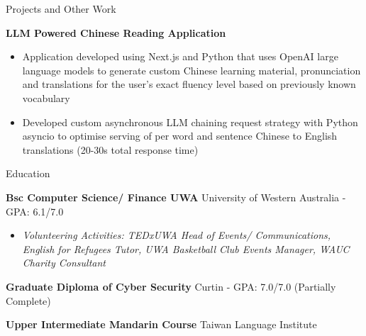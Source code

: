 \documentclass{resume} %
\begin{document}
	\begin{rSection}{Projects and Other Work}
		\vspace{-0.8em}
		\item \textbf{LLM Powered Chinese Reading Application} 
		\begin{itemize} 
			\item Application developed using Next.js and Python that uses OpenAI large language models to generate custom Chinese learning material, pronunciation and translations for the user's exact fluency level based on previously known vocabulary
			\item Developed custom asynchronous LLM chaining request strategy with Python asyncio to optimise serving of per word and sentence Chinese to English translations (20-30s total response time)
		\end{itemize}
	\end{rSection} 
	
	\begin{rSection}{Education}
		\vspace{-0.8em}
		\item \textbf{Bsc Computer Science/ Finance UWA} {University of Western Australia} - GPA: 6.1/7.0 \hfill 
		\begin{itemize} 
			\scriptsize\item \textit{Volunteering Activities: TEDxUWA Head of Events/ Communications, English for Refugees Tutor, UWA Basketball Club Events Manager, WAUC Charity Consultant} \hfill
		\end{itemize}
		\item \textbf{Graduate Diploma of Cyber Security} {Curtin} - GPA: 7.0/7.0 \hfill (Partially Complete)
		\item \textbf{Upper Intermediate Mandarin Course} {Taiwan Language Institute}\hfill 
	\end{rSection} 
\end{document}
